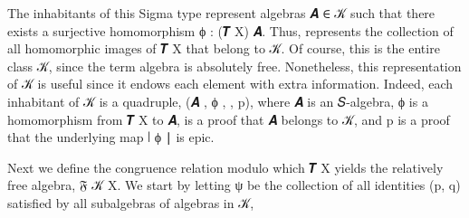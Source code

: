 \documentclass[a4paper,UKenglish,cleveref,autoref,thm-restate]{lipics-v2021}
\begin{document}
\ccpad
The inhabitants of this Sigma type represent algebras \ab 𝑨 \af ∈ \ab 𝒦 such that there exists a surjective homomorphism \ab ϕ \as :  (\af 𝑻 \ab X) \ab 𝑨. Thus,  represents the collection of all homomorphic images of \af 𝑻 \ab X that belong to \ab 𝒦.  Of course, this is the entire class \ab 𝒦, since the term algebra is absolutely free. Nonetheless, this representation of \ab 𝒦 is useful since it endows each element with extra information.  Indeed, each inhabitant of  \ab 𝒦 is a quadruple, (\ab 𝑨 , \ab ϕ , , \ab p), where \ab 𝑨 is an \ab 𝑆-algebra, \ab ϕ is a homomorphism from \af 𝑻 \ab X to \ab 𝑨,  is a proof that \ab 𝑨 belongs to \ab 𝒦, and \ab p is a proof that the underlying map \af ∣ \ab ϕ \af ∣ is epic.

Next we define the congruence relation modulo which \af 𝑻 \ab X yields the relatively free algebra, \af 𝔉 \ab 𝒦 \ab X. We start by letting \af ψ be the collection of all identities (\ab p, \ab q) satisfied by all subalgebras of algebras in \ab 𝒦,
\ccpad
\end{document}
